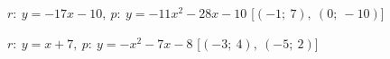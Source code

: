 \begin{esercizio}
\begin{enumeratea}
% 
% 
  \item  $r:~y = -17 x -10,~p:~y=-11 x^2 -28 x -10$
   \hfill [$\left (-1;~7 \right ),~\left (0;~-10 \right )$]
  \item  $r:~y = x +7,~p:~y=- x^2 -7 x -8$
   \hfill [$\left (-3;~4 \right ),~\left (-5;~2 \right )$]

\end{enumeratea}
\end{esercizio}
